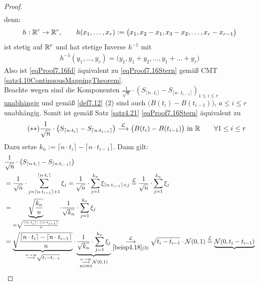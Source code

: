 \begin{proof}
\begin{align}
	\end{align}
	denn:
	\begin{align*}
		h:\mathbb{R}^r\to\mathbb{R}^r,\qquad h(x_1,\ldots,x_r):=\big(x_1,x_2-x_1,x_3-x_2,\ldots,x_r-x_{r-1}\big)
	\end{align*}
	ist stetig auf $\mathbb{R}^r$ und hat stetige Inverse $h^{-1}$ mit 
	\begin{align*}
		h^{-1}(y_1,\ldots,y_r)=\big(y_1,y_1+y_2,\ldots,y_1+\ldots+y_r\big)
	\end{align*}
	Also ist \eqref{eqProof7.16fd} äquivalent zu \eqref{eqProof7.16Stern} gemäß CMT \ref{satz4.10ContinuousMappingTheorem}.\\
	Beachte wegen  sind die Komponenten $\frac{1}{\sqrt{n}}\cdot\left(S_{\lceil n\cdot t_i\rceil}-S_{\lceil n\cdot t_{i-1}\rceil}\right)_{1\leq i\leq r}$ \underline{unabhängig} und gemäß \ref{def7.12} (2) sind auch $\big(B(t_i)-B(t_{i-1})\big)$, $a\leq i\leq r$ unabhängig. 
	Somit ist gemäß Satz \ref{satz4.21} \eqref{eqProof7.16Stern} äquivalent zu 
	\begin{align}\label{eqProof7.16SternStern}\tag{$\ast\ast$}
		\frac{1}{\sqrt{n}}\cdot\left(S_{\lceil n\cdot t_i\rceil}-S_{\lceil n\cdot t_{i-1}\rceil}\right)
		\stackrel{\mathcal{L}}{\longrightarrow}
		\big(B(t_i)-B(t_{i-1})\big)\text{ in }\mathbb{R}\qquad\forall 1\leq i\leq r
	\end{align}
	Dazu setze $k_n:=\lceil n\cdot t_i\rceil-\lceil n\cdot t_{i-1}\rceil$. Dann gilt:
	\begin{align*}
		&\frac{1}{\sqrt{n}}\cdot\left(S_{\lceil n\cdot t_i\rceil}-S_{\lceil n\cdot t_{i-1}\rceil}\right)\\
		&=\frac{1}{\sqrt{n}}\cdot\sum\limits_{j=\lceil n\cdot t_{i-1}\rceil+1}^{\lceil n\cdot t_i\rceil}\xi_j
		=\frac{1}{\sqrt{n}}\cdot\sum\limits_{j=1}^{k_n}\xi_{\lceil n\cdot t_{i-1}\rceil+j}
		\overset{\mathcal{L}}{=}
		\frac{1}{\sqrt{n}}\cdot\sum\limits_{j=1}^{k_n}\xi_j\\
		&=\underbrace{\sqrt{\frac{k_n}{n}}}_{=\sqrt{\frac{\lceil n\cdot t_i\rceil-\lceil n\cdot t_{i-1}\rceil}{n}}}\cdot\frac{1}{\sqrt{k_n}}\cdot\sum\limits_{j=1}^{k_n}\xi_j\\
		&=\underbrace{\sqrt{\frac{\lceil n\cdot t_i\rceil-\lceil n\cdot t_{i-1}\rceil}{n}}}_{\stackrel{n\to\infty}{\longrightarrow}\sqrt{t_i-t_{i-1}}}\cdot\underbrace{\frac{1}{\sqrt{k_n}}\cdot\sum\limits_{j=1}^{k_n}\xi_j}_{\underset{\text{ZGWS}}{\overset{n\to\infty}{\longrightarrow}}\mathcal{N}(0,1)}\underset{\ref{beisp4.18}(3)}{\overset{\mathcal{L}}{\longrightarrow}}\sqrt{t_i-t_{i-1}}\cdot\mathcal{N}(0,1)
		\overset{\mathcal{L}}{=}\underbrace{\mathcal{N}(0,t_i-t_{i-1})}_{
}
\end{align*}
\end{proof}
